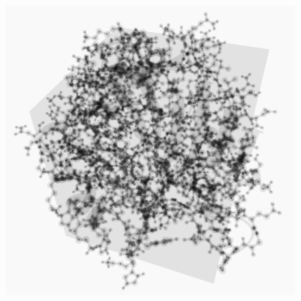 \documentclass{egpubl}
\newlength{\boxheight}
\begin{document}
\begin{figure}[tcb]
\begin{minipage}[b][\boxheight][b]{0.24\linewidth}
\begin{minipage}[b]{0.98\linewidth}
    \end{minipage}%
  \end{minipage}%
  \hfill%
  \usebox\savedProteinBox
  \hfill%
  \begin{minipage}[b][\boxheight][b]{0.24\linewidth}
    \centering%
    \begin{minipage}[t]{0.98\linewidth}
      \centering
      \includegraphics[width=\linewidth]{snapshots/mol/cgf/dci-scaled-inv}
    \end{minipage}%
    \vfill%
    \begin{minipage}[b]{0.98\linewidth}
      \centering

\end{minipage}
\end{minipage}
\end{figure}
\end{document}
